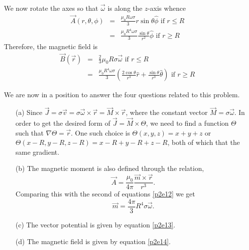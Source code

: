\documentclass{article}
\begin{document}
\begin{enumerate}
We now rotate the axes so that $\vec{\omega}$ is along the $z$-axis whence
\begin{eqnarray}
\vec{A}(r, \theta, \phi)&=& \frac{\mu_0R\omega\sigma}{3}r\sin\theta\hat{\phi} \text{ if } r \le R \nonumber \\
 &=& \frac{\mu_0R^4\omega\sigma}{3}\frac{\sin\theta}{r^2}\hat{\phi} \text{ if } r \ge R \label{p2e13}
\end{eqnarray}
Therefore, the magnetic field is
\begin{eqnarray}
\vec{B}(\vec{r}) &=& \frac{2}{3}\mu_0 R\sigma\vec{\omega} \text{ if } r \le R \nonumber \\
 &=& \frac{\mu_0R^4\omega\sigma}{3}\left(\frac{2\cos\theta}{r^3}\hat{r} + \frac{\sin\theta}{r^3}\hat{\theta}\right) \text{ if } r \ge R \label{p2e14}
\end{eqnarray}

We are now in a position to answer the four questions related to this
problem.
\begin{enumerate}
\item[(a)] Since $\vec{J} = \sigma\vec{v} = \sigma\vec{\omega}\times\vec{r}
= \vec{M}\times\vec{r}$, where the constant vector $\vec{M} = 
\sigma\vec{\omega}$. In order to get the desired form of $\vec{J} = 
\vec{M} \times \Theta$, we need to find a function $\Theta$ such 
that $\nabla\Theta = \vec{r}$. One such choice is $\Theta(x, y, z) = 
x + y + z$ or $\Theta(x - R, y - R, z - R) = x - R + y - R + z - R$, 
both of which that the same gradient.
\item[(b)] The magnetic moment is also defined through the relation,
\[
\vec{A} = \frac{\mu_0}{4\pi} \frac{\vec{m}\times\vec{r}}{r^3}.
\]
Comparing this with the second of equations \eqref{p2e12} we get
\[
\vec{m} = \frac{4\pi}{3}R^4\sigma\vec{\omega}.
\]
\item[(c)] The vector potential is given by equation \eqref{p2e13}.
\item[(d)] The magnetic field is given by equation \eqref{p2e14}.
\end{enumerate}

\end{enumerate}
\end{document}
